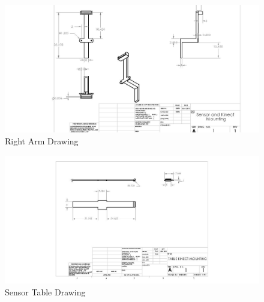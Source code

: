 \documentclass[oneside,final,a4paper]{report}
\begin{document}
\begin{figure}[hbt]
 \centering
 \includegraphics[scale=0.5]{Drawing_Right}
 \caption{Right Arm Drawing}
\end{figure}

\begin{figure}[hbt]
 \centering
 \includegraphics[scale=0.5]{Drawing_Table}
 \caption{Sensor Table Drawing}
\end{figure}
\end{document}
